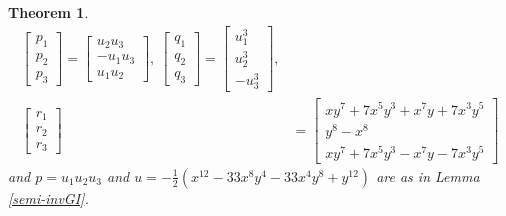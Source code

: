 \documentclass[a4paper,reqno]{amsart}
\newtheorem{theorem}{Theorem}[section]
\theoremstyle{definition}
\theoremstyle{remark} \newtheorem{remark}[theorem]{Remark}
\numberwithin{equation}{section}
\begin{document}
\begin{theorem}
\begin{align*}
\begin{bmatrix}
            p_1 \\
            p_2 \\
            p_3
        \end{bmatrix}
        =
        \begin{bmatrix}
            u_2u_3 \\
            -u_1u_3 \\
            u_1u_2
        \end{bmatrix}, \:
        \begin{bmatrix}
            q_1 \\
            q_2 \\
            q_3
        \end{bmatrix}
        =
        \begin{bmatrix}
            u_1^3 \\
            u_2^3 \\
            -u_3^3
        \end{bmatrix}, \\
        \begin{bmatrix}
            r_1 \\
            r_2 \\
            r_3
        \end{bmatrix}
        &=
        \begin{bmatrix}
            xy^7 + 7x^5y^3 + x^7y + 7x^3y^5 \\
            y^8 - x^8 \\
            xy^7 + 7x^5y^3 - x^7y - 7x^3y^5
        \end{bmatrix}
    \end{align*}
    \fi
    and \(p = u_1u_2u_3\) and \(u = -\frac{1}{2}(x^{12} - 33x^8y^4 - 33x^4y^8 + y^{12})\) are as in Lemma \ref{semi-invGI}.
\end{theorem}
\end{document}
